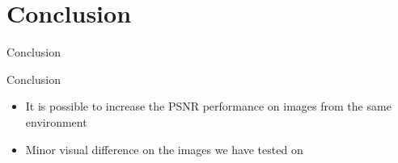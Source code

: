 \section{Conclusion}
\begin{frame}{Conclusion}{}
    \begin{block}{Conclusion}
        \begin{itemize}
            \item It is possible to increase the PSNR performance on images from the same environment
            \item Minor visual difference on the images we have tested on
        \end{itemize}
    \end{block}
\end{frame}
